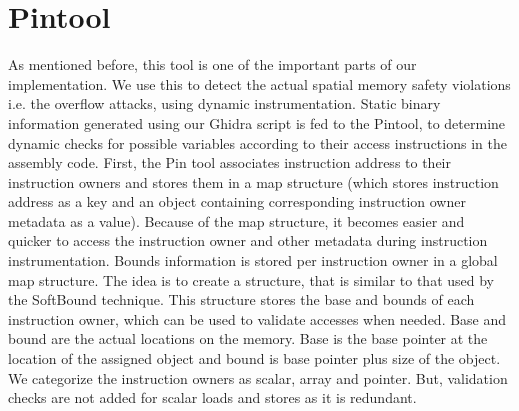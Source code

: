 \section{Pintool}
As mentioned before, this tool is one of the important parts of our implementation. We use this to detect the actual spatial memory safety violations i.e. the overflow attacks, using dynamic instrumentation. Static binary information generated using our Ghidra script is fed to the Pintool, to determine dynamic checks for possible variables according to their access instructions in the assembly code. First, the Pin tool associates instruction address to their instruction owners and stores them in a map structure (which stores instruction address as a key and an object containing corresponding instruction owner metadata as a value). Because of the map structure, it becomes easier and quicker to access the instruction owner and other metadata during instruction instrumentation. Bounds information is stored per instruction owner in a global map structure. The idea is to create a structure, that is similar to that used by the SoftBound technique. This structure stores the base and bounds of each instruction owner, which can be used to validate accesses when needed. Base and bound are the actual locations on the memory. Base is the base pointer at the location of the assigned object and bound is base pointer plus size of the object. We categorize the instruction owners as scalar, array and pointer. But, validation checks are not added for scalar loads and stores as it is redundant.

